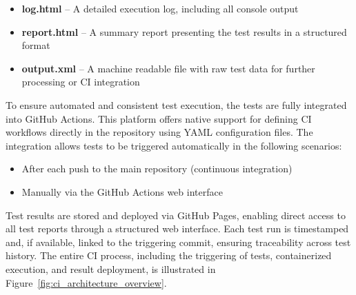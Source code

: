 \begin{itemize}
	\item \textbf{log.html} – A detailed execution log, including all console output
	\item \textbf{report.html} – A summary report presenting the test results in a structured format
	\item \textbf{output.xml} – A machine readable file with raw test data for further processing or CI integration
\end{itemize}

\vspace{0.9em}
To ensure automated and consistent test execution, the tests are fully integrated into GitHub Actions. This platform offers native support for defining CI workflows directly in the repository using YAML configuration files. The integration allows tests to be triggered automatically in the following scenarios:

\begin{itemize}
	\item After each push to the main repository (continuous integration)
	\item Manually via the GitHub Actions web interface
\end{itemize}

\vspace{0.5em}
Test results are stored and deployed via GitHub Pages, enabling direct access to all test reports through a structured web interface. Each test run is timestamped and, if available, linked to the triggering commit, ensuring traceability across test history. The entire CI process, including the triggering of tests, containerized execution, and result deployment, is illustrated in Figure~\ref{fig:ci_architecture_overview}.


